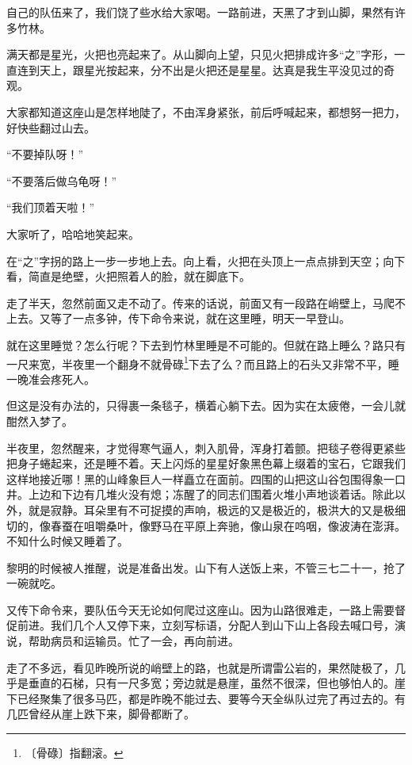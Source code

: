 \documentclass[12pt,UTF-8,openany]{ctexbook}
\begin{document}
\begin{normalsize}
    自己的队伍来了，我们饶了些水给大家喝。一路前进，天黑了才到山脚，果然有许多竹林。
    
    满天都是星光，火把也亮起来了。从山脚向上望，只见火把排成许多“之”字形，一直连到天上，跟星光按起来，分不出是火把还是星星。达真是我生平没见过的奇观。
    
    大家都知道这座山是怎样地陡了，不由浑身紧张，前后呼喊起来，都想努一把力，好快些翻过山去。
    
    “不要掉队呀！”
    
    “不要落后做乌龟呀！”
    
    “我们顶着天啦！”
    
    大家听了，哈哈地笑起来。
    
    在“之”字拐的路上一步一步地上去。向上看，火把在头顶上一点点排到天空；向下看，简直是绝壁，火把照着人的脸，就在脚底下。
    
    走了半天，忽然前面又走不动了。传来的话说，前面又有一段路在峭壁上，马爬不上去。又等了一点多钟，传下命令来说，就在这里睡，明天一早登山。
    
    就在这里睡觉？怎么行呢？下去到竹林里睡是不可能的。但就在路上睡么？路只有一尺来宽，半夜里一个翻身不就骨碌\footnote{〔骨碌〕指翻滚。}下去了么？而且路上的石头又非常不平，睡一晚准会疼死人。
    
    但这是没有办法的，只得裹一条毯子，横着心躺下去。因为实在太疲倦，一会儿就酣然入梦了。
    
    半夜里，忽然醒来，才觉得寒气逼人，刺入肌骨，浑身打着颤。把毯子卷得更紧些把身子蜷起来，还是睡不着。天上闪烁的星星好象黑色幕上缀着的宝石，它跟我们这样地接近哪！黑的山峰象巨人一样矗立在面前。四围的山把这山谷包围得象一口井。上边和下边有几堆火没有熄；冻醒了的同志们围着火堆小声地谈着话。除此以外，就是寂静。耳朵里有不可捉摸的声响，极远的又是极近的，极洪大的又是极细切的，像春蚕在咀嚼桑叶，像野马在平原上奔驰，像山泉在呜咽，像波涛在澎湃。不知什么时候又睡着了。
    
    黎明的时候被人推醒，说是准备出发。山下有人送饭上来，不管三七二十一，抢了一碗就吃。
    
    又传下命令来，要队伍今天无论如何爬过这座山。因为山路很难走，一路上需要督促前进。我们几个人又停下来，立刻写标语，分配人到山下山上各段去喊口号，演说，帮助病员和运输员。忙了一会，再向前进。
    
    走了不多远，看见昨晚所说的峭壁上的路，也就是所谓雷公岩的，果然陡极了，几乎是垂直的石梯，只有一尺多宽；旁边就是悬崖，虽然不很深，但也够怕人的。崖下已经聚集了很多马匹，都是昨晚不能过去、要等今天全纵队过完了再过去的。有几匹曾经从崖上跌下来，脚骨都断了。
    

\end{normalsize}
\end{document}
